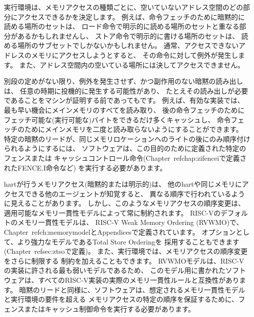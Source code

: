 実行環境は、メモリアクセスの種類ごとに、空いていないアドレス空間のどの部分にアクセスできるかを決定します。
例えば、命令フェッチのために暗黙的に読める場所のセットは、
ロード命令で明示的に読める場所のセットと重なる部分があるかもしれませんし、
ストア命令で明示的に書ける場所のセットは、
読める場所のサブセットでしかないかもしれません。
通常、アクセスできないアドレスのメモリにアクセスしようとすると、
その命令に対して例外が発生します。
また、アドレス空間内の空いている場所には決してアクセスできません。

別段の定めがない限り、例外を発生させず、かつ副作用のない暗黙の読み出しは、
任意の時期に投機的に発生する可能性があり、
たとえその読み出しが必要であることをマシンが証明する前であってもです。 例えば、有効な実装では、最も早い機会にメインメモリのすべてを読み取り、
後の命令フェッチのためにフェッチ可能な(実行可能な)バイトをできるだけ多くキャッシュし、
命令フェッチのためにメインメモリを二度と読み取らないようにすることができます。 特定の暗黙のリードが、同じメモリロケーションへのライトの後にのみ順序付けられるようにするには、
ソフトウェアは、この目的のために定義された特定のフェンスまたは
キャッシュコントロール命令(Chapter~ref{chap:zifencei}で定義されたFENCE.I命令など)
を実行する必要があります。

hartが行うメモリアクセス(暗黙的または明示的)は、
他のhartや同じメモリにアクセスできる他のエージェントが知覚すると、
異なる順序で行われているように見えることがあります。
しかし、このようなメモリアクセスの順序変更は、適用可能なメモリ一貫性モデルによって常に制約されます。
RISC-Vのデフォルトのメモリ一貫性モデルは、
RISC-V Weak Memory Ordering (RVWMO)で、Chapter~ref{ch:memorymodel}とAppendicesで定義されています。
オプションとして、より強力なモデルであるTotal Store Orderingを
採用することもできます(Chapter~ref{sec:ztso}で定義)。 
また、実行環境では、メモリアクセスの順序変更をさらに制限する
制約を加えることもできます。
RVWMOモデルは、RISC-Vの実装に許される最も弱いモデルであるため、
このモデル用に書かれたソフトウェアは、すべてのRISC-V実装の実際のメモリ一貫性ルールと互換性があります。
暗黙のリードと同様に、ソフトウェアは、想定されるメモリ一貫性モデルと実行環境の要件を超える
メモリアクセスの特定の順序を保証するために、フェンスまたはキャッシュ制御命令を実行する必要があります。

